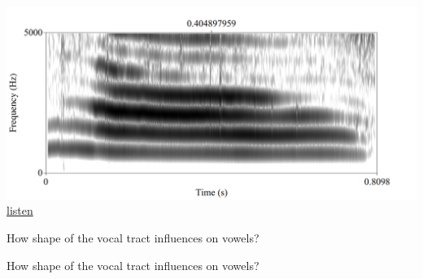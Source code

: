\begin{frame}{}
\includegraphics[width=\linewidth]{14-cat-meow.png}\\
\href{https://github.com/agricolamz/2018_m_Instrumental_Phonetics/raw/master/docs/materials/cat_meow.wav}{listen}
\end{frame}

\begin{frame}{How shape of the vocal tract influences on vowels?}
\Large
\vfill
\begin{center}
\begin{vowel}
\end{vowel}
\end{center}
\vfill
\end{frame}

\begin{frame}{How shape of the vocal tract influences on vowels?}
\Large
\vfill
\begin{center}
\begin{vowel}
\end{vowel}
\end{center}
\vfill
\end{frame}

